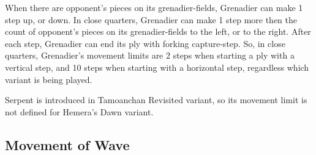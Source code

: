 When there are opponent's pieces on its grenadier-fields, Grenadier can make 1
step up, or down. In close quarters, Grenadier can make 1 step more then the count
of opponent's pieces on its grenadier-fields to the left, or to the right. After
each step, Grenadier can end its ply with forking capture-step. \newline
\indent
So, in close quarters, Grenadier's movement limits are 2 steps when starting
a ply with a vertical step, and 10 steps when starting with a horizontal step,
regardless which variant is being played.

Serpent is introduced in Tamoanchan Revisited variant, so its movement limit is
not defined for Hemera's Dawn variant.

\clearpage %

\subsection*{Movement of Wave}
\label{sec:Appendix/Movement of Wave}

